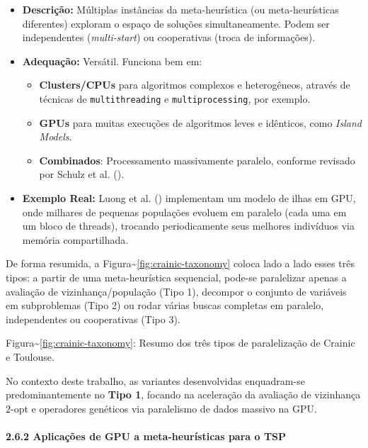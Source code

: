 \begin{enumerate}
  \begin{itemize}
  \tightlist
  \item
    \textbf{Descrição:} Múltiplas instâncias da meta-heurística (ou
    meta-heurísticas diferentes) exploram o espaço de soluções
    simultaneamente. Podem ser independentes (\emph{multi-start}) ou
    cooperativas (troca de informações).
  \item
    \textbf{Adequação:} Versátil. Funciona bem em:

    \begin{itemize}
    \tightlist
    \item
      \textbf{Clusters/CPUs} para algoritmos complexos e heterogêneos,
      através de técnicas de \texttt{multithreading} e
      \texttt{multiprocessing}, por exemplo.
    \item
      \textbf{GPUs} para muitas execuções de algoritmos leves e
      idênticos, como \emph{Island Models}.
    \item
      \textbf{Combinados}: Processamento massivamente paralelo, conforme
      revisado por Schulz et al. ().
    \end{itemize}
  \item
    \textbf{Exemplo Real:} Luong et al. ()
    implementam um modelo de ilhas em GPU, onde milhares de pequenas
    populações evoluem em paralelo (cada uma em um bloco de threads),
    trocando periodicamente seus melhores indivíduos via memória
    compartilhada.
  \end{itemize}
\end{enumerate}

De forma resumida, a Figura\textasciitilde{}\ref{fig:crainic-taxonomy}
coloca lado a lado esses três tipos: a partir de uma meta-heurística
sequencial, pode-se paralelizar apenas a avaliação de
vizinhança/população (Tipo 1), decompor o conjunto de variáveis em
subproblemas (Tipo 2) ou rodar várias buscas completas em paralelo,
independentes ou cooperativas (Tipo 3).

Figura\textasciitilde{}\ref{fig:crainic-taxonomy}: Resumo dos três tipos
de paralelização de Crainic e Toulouse.

No contexto deste trabalho, as variantes desenvolvidas enquadram-se
predominantemente no \textbf{Tipo 1}, focando na aceleração da avaliação
de vizinhança \(2\)-opt e operadores genéticos via paralelismo de dados
massivo na GPU.

\paragraph{2.6.2 Aplicações de GPU a meta-heurísticas para o
TSP}\label{sec-262-gpu-aplicacoes-tsp}

